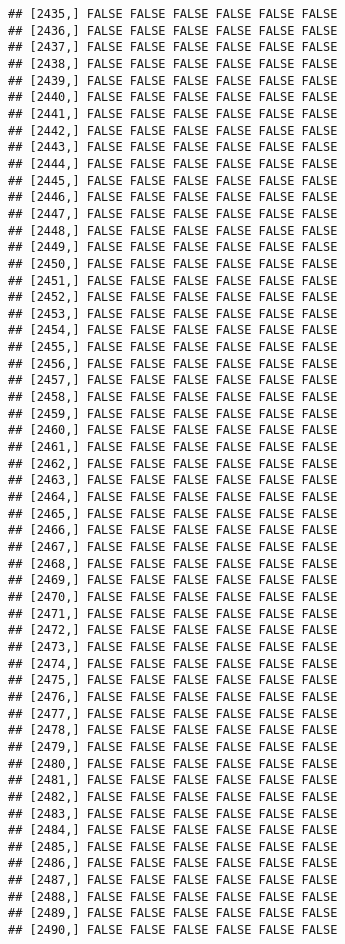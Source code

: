 \documentclass[
]{article}
\begin{document}
\begin{verbatim}
## [2435,] FALSE FALSE FALSE FALSE FALSE FALSE
## [2436,] FALSE FALSE FALSE FALSE FALSE FALSE
## [2437,] FALSE FALSE FALSE FALSE FALSE FALSE
## [2438,] FALSE FALSE FALSE FALSE FALSE FALSE
## [2439,] FALSE FALSE FALSE FALSE FALSE FALSE
## [2440,] FALSE FALSE FALSE FALSE FALSE FALSE
## [2441,] FALSE FALSE FALSE FALSE FALSE FALSE
## [2442,] FALSE FALSE FALSE FALSE FALSE FALSE
## [2443,] FALSE FALSE FALSE FALSE FALSE FALSE
## [2444,] FALSE FALSE FALSE FALSE FALSE FALSE
## [2445,] FALSE FALSE FALSE FALSE FALSE FALSE
## [2446,] FALSE FALSE FALSE FALSE FALSE FALSE
## [2447,] FALSE FALSE FALSE FALSE FALSE FALSE
## [2448,] FALSE FALSE FALSE FALSE FALSE FALSE
## [2449,] FALSE FALSE FALSE FALSE FALSE FALSE
## [2450,] FALSE FALSE FALSE FALSE FALSE FALSE
## [2451,] FALSE FALSE FALSE FALSE FALSE FALSE
## [2452,] FALSE FALSE FALSE FALSE FALSE FALSE
## [2453,] FALSE FALSE FALSE FALSE FALSE FALSE
## [2454,] FALSE FALSE FALSE FALSE FALSE FALSE
## [2455,] FALSE FALSE FALSE FALSE FALSE FALSE
## [2456,] FALSE FALSE FALSE FALSE FALSE FALSE
## [2457,] FALSE FALSE FALSE FALSE FALSE FALSE
## [2458,] FALSE FALSE FALSE FALSE FALSE FALSE
## [2459,] FALSE FALSE FALSE FALSE FALSE FALSE
## [2460,] FALSE FALSE FALSE FALSE FALSE FALSE
## [2461,] FALSE FALSE FALSE FALSE FALSE FALSE
## [2462,] FALSE FALSE FALSE FALSE FALSE FALSE
## [2463,] FALSE FALSE FALSE FALSE FALSE FALSE
## [2464,] FALSE FALSE FALSE FALSE FALSE FALSE
## [2465,] FALSE FALSE FALSE FALSE FALSE FALSE
## [2466,] FALSE FALSE FALSE FALSE FALSE FALSE
## [2467,] FALSE FALSE FALSE FALSE FALSE FALSE
## [2468,] FALSE FALSE FALSE FALSE FALSE FALSE
## [2469,] FALSE FALSE FALSE FALSE FALSE FALSE
## [2470,] FALSE FALSE FALSE FALSE FALSE FALSE
## [2471,] FALSE FALSE FALSE FALSE FALSE FALSE
## [2472,] FALSE FALSE FALSE FALSE FALSE FALSE
## [2473,] FALSE FALSE FALSE FALSE FALSE FALSE
## [2474,] FALSE FALSE FALSE FALSE FALSE FALSE
## [2475,] FALSE FALSE FALSE FALSE FALSE FALSE
## [2476,] FALSE FALSE FALSE FALSE FALSE FALSE
## [2477,] FALSE FALSE FALSE FALSE FALSE FALSE
## [2478,] FALSE FALSE FALSE FALSE FALSE FALSE
## [2479,] FALSE FALSE FALSE FALSE FALSE FALSE
## [2480,] FALSE FALSE FALSE FALSE FALSE FALSE
## [2481,] FALSE FALSE FALSE FALSE FALSE FALSE
## [2482,] FALSE FALSE FALSE FALSE FALSE FALSE
## [2483,] FALSE FALSE FALSE FALSE FALSE FALSE
## [2484,] FALSE FALSE FALSE FALSE FALSE FALSE
## [2485,] FALSE FALSE FALSE FALSE FALSE FALSE
## [2486,] FALSE FALSE FALSE FALSE FALSE FALSE
## [2487,] FALSE FALSE FALSE FALSE FALSE FALSE
## [2488,] FALSE FALSE FALSE FALSE FALSE FALSE
## [2489,] FALSE FALSE FALSE FALSE FALSE FALSE
## [2490,] FALSE FALSE FALSE FALSE FALSE FALSE

\end{verbatim}
\end{document}
